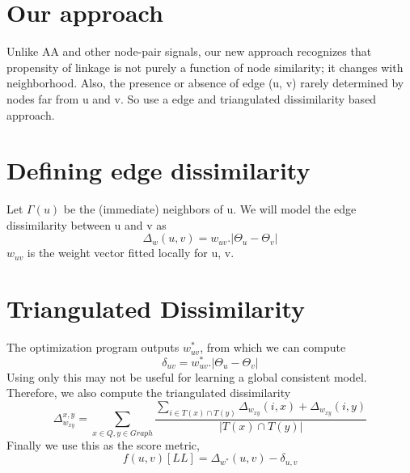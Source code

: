 \documentclass{article}
\begin{document}
\section*{Our approach}
Unlike AA and other node-pair signals, our new approach recognizes that propensity of linkage is not purely a function of node similarity; it changes with neighborhood. Also, the presence or absence of edge (u, v) rarely determined by nodes far from u and v. So use a edge and triangulated dissimilarity based approach.


\section*{Defining edge dissimilarity}
Let $\Gamma(u)$ be the (immediate) neighbors of u. We will model the edge dissimilarity between u and v as
\begin{equation}
\Delta_{w}(u,v) = w_{uv} . |\Theta_u - \Theta_v|
\end{equation}
 $w_{uv}$ is the weight vector fitted locally for u, v. 
 
\section*{Triangulated Dissimilarity}
The optimization program outputs $w_{uv}^{\ast}$, from which we can compute 
\begin{equation}
\delta_{uv} = w_{uv}^{\ast} . |\Theta_u - \Theta_v|
\end{equation}
Using only this may not be useful for learning a global consistent model. Therefore, we also compute the triangulated dissimilarity
\begin{equation}
\Delta_{w_{xy}}^{x,y} = \sum_{x \in Q,y \in Graph} \frac{\sum_{i \in T(x) \cap T(y)} \Delta_{w_{xy}}(i,x) + \Delta_{w_{xy}}(i,y)}{ |T(x) \cap T(y)|}
\end{equation}
Finally we use this as the score metric,
\begin{equation}
f(u,v)[LL] = \Delta_{w^{*}}(u,v) - \delta_{u,v}
\end{equation}
\end{document}

